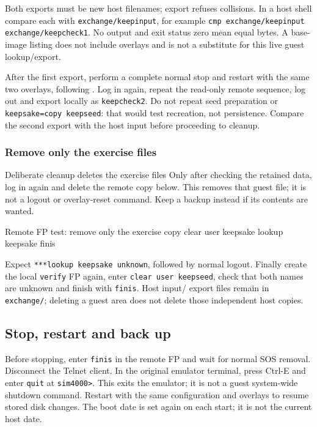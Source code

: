 Both exports must be new host filenames; export refuses collisions. In a host
shell compare each with \texttt{exchange/keepinput}, for example
\texttt{cmp exchange/keepinput exchange/keepcheck1}. No output and exit status
zero mean equal bytes. A base-image listing does not include overlays and is
not a substitute for this live guest lookup/export.

After the first export, perform a complete normal stop and restart with the same
two overlays, following .
Log in again, repeat the read-only remote sequence, log out and export locally
as \texttt{keepcheck2}. Do not repeat seed preparation or
\texttt{keepsake=copy keepseed}: that would test recreation, not persistence.
Compare the second export with the host input before proceeding to cleanup.

\subsubsection{Remove only the exercise files}

\begin{operationnote}{Deliberate cleanup deletes the exercise files}
Only after checking the retained data, log in again and delete the remote
copy below. This removes that guest file; it is not a logout or overlay-reset
command. Keep a backup instead if its contents are wanted.
\end{operationnote}

\begin{commandexample}{Remote FP test: remove only the exercise copy}
clear user keepsake
lookup keepsake
finis
\end{commandexample}

Expect \texttt{***lookup keepsake unknown}, followed by normal logout. Finally
create the local \texttt{verify} FP again, enter \texttt{clear user keepseed},
check that both names are unknown and finish with \texttt{finis}. Host input/
export files remain in \texttt{exchange/}; deleting a guest area does not delete
those independent host copies.

\subsection{Stop, restart and back up}\label{mips-ts-normal-stop}

Before stopping, enter \texttt{finis} in the remote FP and wait for normal
SOS removal. Disconnect the Telnet client. In the original emulator terminal,
press Ctrl-E and enter \texttt{quit} at \texttt{sim4000>}. This exits the
emulator; it is not a guest system-wide shutdown command. Restart with the
same configuration and overlays to resume stored disk changes. The boot
date is set again on each start; it is not the current host date.

